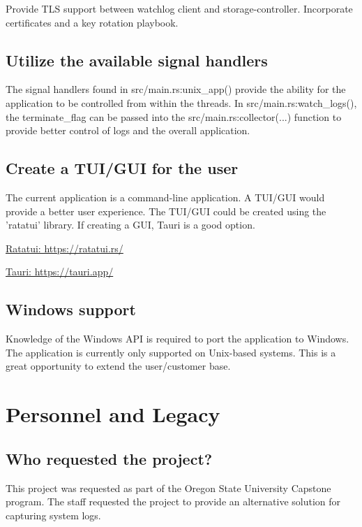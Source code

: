 \documentclass{article}
\begin{document}
Provide TLS support between watchlog client and storage-controller. Incorporate certificates and a key rotation playbook.

\subsection{Utilize the available signal handlers}

The signal handlers found in src/main.rs:unix\_app() provide the ability for the application to be controlled from within the threads. In src/main.rs:watch\_logs(), the terminate\_flag can be passed into the src/main.rs:collector(...) function to provide better control of logs and the overall application.

\subsection{Create a TUI/GUI for the user}

The current application is a command-line application. A TUI/GUI would provide a better user experience. The TUI/GUI could be created using the 'ratatui' library. If creating a GUI, Tauri is a good option.\vspace{0.25cm}

\href{https://ratatui.rs/}{Ratatui: https://ratatui.rs/}

\href{https://tauri.app/}{Tauri: https://tauri.app/}

\subsection{Windows support}

Knowledge of the Windows API is required to port the application to Windows. The application is currently only supported on Unix-based systems. This is a great opportunity to extend the user/customer base.

\newpage

\section{Personnel and Legacy}

\subsection{Who requested the project?}

This project was requested as part of the Oregon State University Capstone program. The staff requested the project to provide an alternative solution for capturing system logs.
\end{document}
